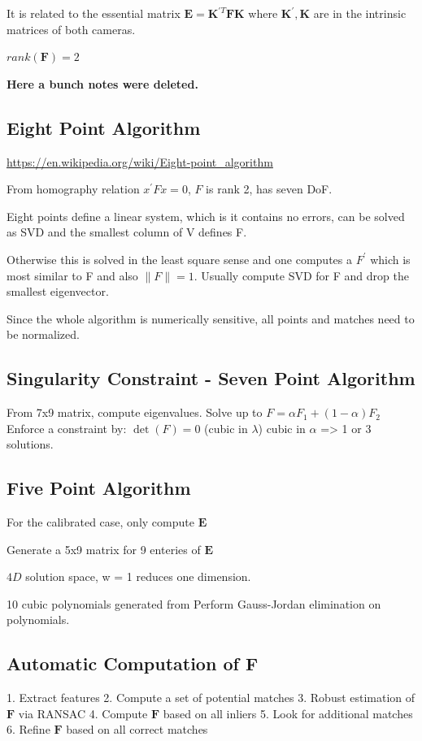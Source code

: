 It is related to the essential matrix $\mathbf{E} = \mathbf{K}^{\prime T} \mathbf{FK}$ where $\mathbf{K}^{\prime}, \mathbf{K}$ are in the intrinsic matrices of both cameras.

$rank(\mathbf{F}) = 2$

\textbf{Here a bunch notes were deleted.}

\subsection{Eight Point Algorithm}

\url{https://en.wikipedia.org/wiki/Eight-point_algorithm}

From homography relation $x^\prime F x = 0$, $F$ is rank 2, has seven DoF. 

Eight points define a linear system, which is it contains no errors, can be solved as SVD and the smallest column of V defines F.

Otherwise this is solved in the least square sense and one computes a $F^\prime$ which is most similar to F and also $\|F\|=1$. Usually compute SVD for F and drop the smallest eigenvector. 

Since the whole algorithm is numerically sensitive, all points and matches need to be normalized. 

\subsection{Singularity Constraint - Seven Point Algorithm}
From 7x9 matrix, compute eigenvalues.
Solve up to $F = \alpha F_1 + (1-\alpha) F_2$
Enforce a constraint by: $\det(F) = 0$ (cubic in $\lambda$)
cubic in $\alpha$ => 1 or 3 solutions.

\subsection{Five Point Algorithm}

For the calibrated case, only compute $\mathbf{E}$

Generate a 5x9 matrix for 9 enteries of $\mathbf{E}$

$4D$ solution space, w = 1 reduces one dimension.

10 cubic polynomials generated from 
Perform Gauss-Jordan elimination on polynomials.

\subsection{Automatic Computation of $\mathbf{F}$}
1. Extract features
2. Compute a set of potential matches
3. Robust estimation of $\mathbf{F}$ via RANSAC  
4. Compute $\mathbf{F}$ based on all inliers
5. Look for additional matches
6. Refine $\mathbf{F}$ based on all correct matches

